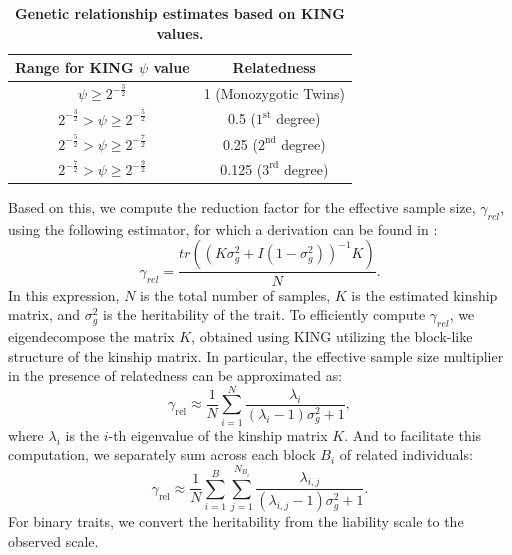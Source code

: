 \begin{table}[h!]
\centering
\begin{tabular}{|c|c|}
\hline
\textbf{Range for KING $\psi$ value} & \textbf{Relatedness} \\
\hline
$\psi \geq 2^{-\frac{3}{2}}$ & 1 (Monozygotic Twins) \\
$2^{-\frac{3}{2}} > \psi \geq 2^{-\frac{5}{2}}$ & 0.5 ($1^{\text{st}}$ degree) \\
$2^{-\frac{5}{2}} > \psi \geq 2^{-\frac{7}{2}}$ & 0.25 ($2^{\text{nd}}$ degree) \\
$2^{-\frac{7}{2}} > \psi \geq 2^{-\frac{9}{2}}$ & 0.125 ($3^{\text{rd}}$ degree) \\
\hline
\end{tabular}
\caption{\textbf{Genetic relationship estimates based on KING values.}}
\label{tab:my_label}
\end{table}

Based on this, we compute the reduction factor for the effective sample size, $\gamma_{rel}$, using the following estimator, for which a derivation can be found in \cite{ziyatdinov2021estimating}:
\begin{equation}
\gamma_{rel} = \frac{tr((K \sigma_g^2 + I (1-\sigma_g^2))^{-1}K)}{N}.
\label{eq:calib_rel}
\end{equation}
In this expression, $N$ is the total number of samples, $K$ is the estimated kinship matrix, and $\sigma_g^2$ is the heritability of the trait.
%
To efficiently compute $\gamma_{rel}$, we eigendecompose the matrix $K$, obtained using KING utilizing the block-like structure of the kinship matrix. 
%
In particular, the effective sample size multiplier in the presence of relatedness can be approximated as:
\begin{equation}
\gamma_{\text{rel}} \approx \frac{1}{N}\sum\limits_{i=1}^{N} \frac{\lambda_i}{(\lambda_i - 1)\sigma_g^2 + 1},
\end{equation}
where $\lambda_i$ is the $i$-th eigenvalue of the kinship matrix $K$.
%
And to facilitate this computation, we separately sum across each block $B_i$ of related individuals:
\begin{equation}
\gamma_{\text{rel}} \approx \frac{1}{N} \sum\limits_{i=1}^{B} \sum\limits_{j=1}^{N_{B_i}} \frac{\lambda_{i,j}}{(\lambda_{i,j} - 1)\sigma_g^2 + 1}.
\end{equation}
%
For binary traits, we convert the heritability from the liability scale to the observed scale.
%

\vspace{2mm}

